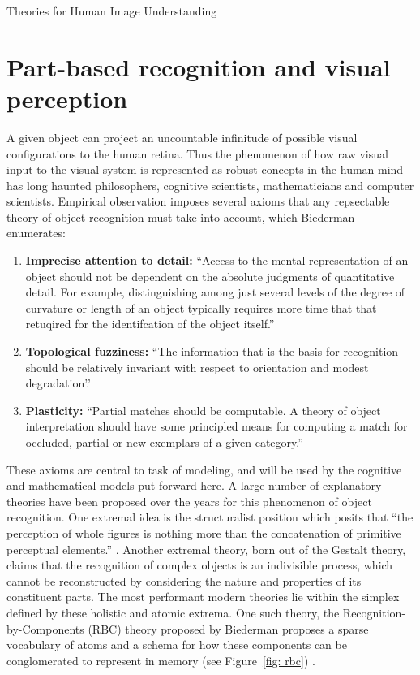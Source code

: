 \documentclass[12pt]{pom_thesis}
\begin{document}
\begin{chapter}{Theories for Human Image Understanding}
\section{Part-based recognition and visual perception}
A given object can project an uncountable infinitude of possible visual configurations to the human retina. Thus the phenomenon of how raw visual input to the visual system is represented as robust concepts in the human mind has long haunted philosophers, cognitive scientists, mathematicians and computer scientists. Empirical observation imposes several axioms that any repsectable theory of object recognition must take into account, which Biederman enumerates:
\begin{enumerate}
	\item \textbf{Imprecise attention to detail:} ``Access to the mental representation of an object should not be dependent on the absolute judgments of quantitative detail. For example, distinguishing among just several levels of the degree of curvature or length of an object typically requires more time that that retuqired for the identifcation of the object itself.''
	\item \textbf{Topological fuzziness:} ``The information that is the basis for recognition should be relatively invariant with respect to orientation and modest degradation'.'
	\item \textbf{Plasticity:} ``Partial matches should be computable. A theory of object interpretation should have some principled means for computing a match for occluded, partial or new exemplars of a given category.''
\end{enumerate}
These axioms are central to task of modeling, and will be used by the cognitive and mathematical models put forward here. A large number of explanatory theories have been proposed over the years for this phenomenon of object recognition. One extremal idea is the structuralist position which posits that ``the perception of whole figures is nothing more than the concatenation of primitive perceptual elements.'' \cite{palmer1977hierarchical}. Another extremal theory, born out of the Gestalt theory, claims that the recognition of complex objects is an indivisible process, which cannot be reconstructed by considering the nature and properties of its constituent parts.  The most performant modern theories lie within the simplex defined by these holistic and atomic extrema. One such theory, the Recognition-by-Components (RBC) theory proposed by Biederman proposes a sparse vocabulary of atoms and a schema for how these components can be conglomerated to represent in memory (see Figure~\ref{fig: rbc}) \cite{biederman1987recognition}.

\end{chapter}
\end{document}
